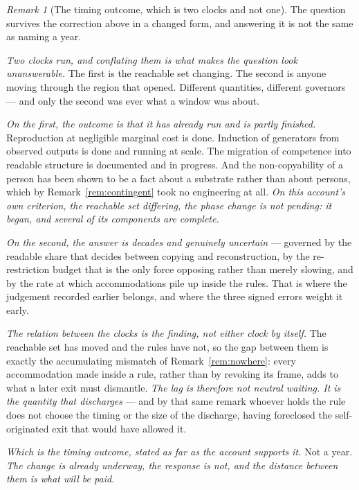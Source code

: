 \documentclass[11pt,a4paper]{article}
\theoremstyle{remark}
\newtheorem{remark}[definition]{Remark}
\begin{document}
\begin{remark}[The timing outcome, which is two clocks and not one]\label{rem:timing}
The question survives the correction above in a changed form, and answering it is not the same as
naming a year.

\emph{Two clocks run, and conflating them is what makes the question look unanswerable.} The first is
the reachable set changing. The second is anyone moving through the region that opened. Different
quantities, different governors --- and only the second was ever what a window was about.

\emph{On the first, the outcome is that it has already run and is partly finished.} Reproduction at
negligible marginal cost is done. Induction of generators from observed outputs is done and running at
scale. The migration of competence into readable structure is documented and in progress. And the
non-copyability of a person has been shown to be a fact about a substrate rather than about persons,
which by Remark~\ref{rem:contingent} took no engineering at all. \emph{On this account's own criterion,
the reachable set differing, the phase change is not pending: it began, and several of its components
are complete.}

\emph{On the second, the answer is decades and genuinely uncertain} --- governed by the readable share
that decides between copying and reconstruction, by the re-restriction budget that is the only force
opposing rather than merely slowing, and by the rate at which accommodations pile up inside the rules.
That is where the judgement recorded earlier belongs, and where the three signed errors weight it early.

\emph{The relation between the clocks is the finding, not either clock by itself.} The reachable set has
moved and the rules have not, so the gap between them is exactly the accumulating mismatch of
Remark~\ref{rem:nowhere}: every accommodation made inside a rule, rather than by revoking its frame,
adds to what a later exit must dismantle. \emph{The lag is therefore not neutral waiting. It is the
quantity that discharges} --- and by that same remark whoever holds the rule does not choose the timing
or the size of the discharge, having foreclosed the self-originated exit that would have allowed it.

\emph{Which is the timing outcome, stated as far as the account supports it.} Not a year. \emph{The
change is already underway, the response is not, and the distance between them is what will be paid.}
\end{remark}
\end{document}
